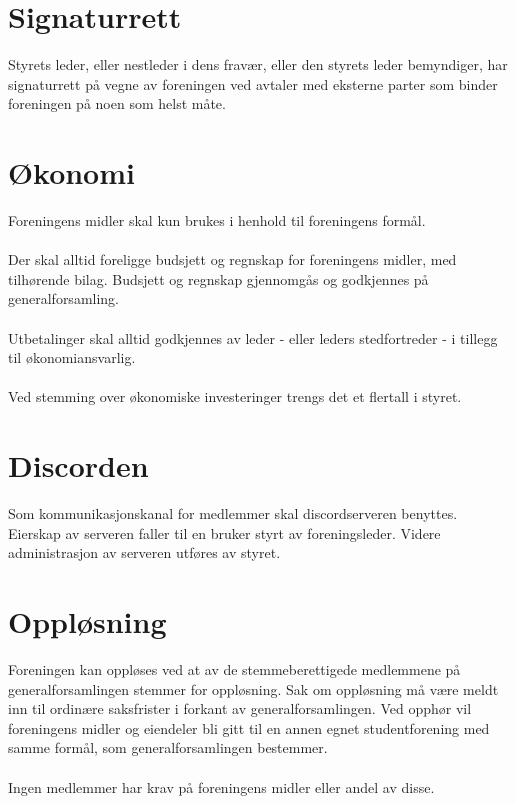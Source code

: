 \documentclass[12pt,a4paper,norsk]{article}
\begin{document}
\section{Signaturrett}

Styrets leder, eller nestleder i dens fravær, eller den styrets leder bemyndiger, har signaturrett
på vegne av foreningen ved avtaler med eksterne parter som binder foreningen på noen som
helst måte.



\section{Økonomi}

Foreningens midler skal kun brukes i henhold til foreningens formål.
\\
\\
Der skal alltid foreligge budsjett og regnskap for foreningens midler, med tilhørende bilag.
Budsjett og regnskap gjennomgås og godkjennes på generalforsamling.
\\
\\
Utbetalinger skal alltid godkjennes av leder - eller leders stedfortreder - i tillegg til
økonomiansvarlig.
\\
\\
Ved stemming over økonomiske investeringer trengs det et  flertall i styret.



\section{Discorden}

Som kommunikasjonskanal for medlemmer skal discordserveren  benyttes.
Eierskap av serveren faller til en bruker styrt av foreningsleder. Videre administrasjon av
serveren utføres av styret.



\section{Oppløsning}

Foreningen kan oppløses ved at  av de stemmeberettigede medlemmene på
generalforsamlingen stemmer for oppløsning. Sak om oppløsning må være meldt inn til
ordinære saksfrister i forkant av generalforsamlingen. Ved opphør vil foreningens midler og
eiendeler bli gitt til en annen egnet studentforening med samme formål, som
generalforsamlingen bestemmer.
\\
\\
Ingen medlemmer har krav på foreningens midler eller andel av disse.
\end{document}
